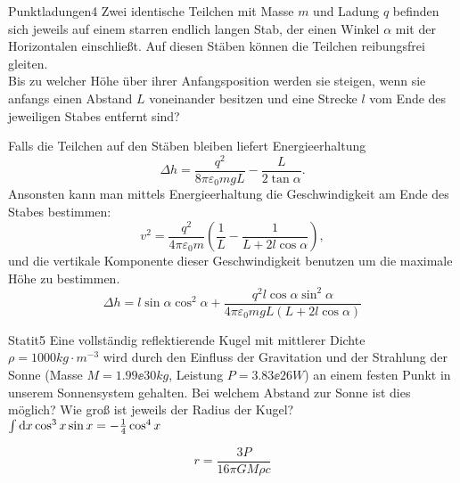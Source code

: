


\begin{problem}{Punktladungen}{4}
Zwei identische Teilchen mit Masse $m$ und Ladung $q$ befinden sich jeweils auf einem starren endlich langen Stab, der einen Winkel $\alpha$ mit der Horizontalen einschließt. Auf diesen Stäben können die Teilchen reibungsfrei gleiten.\\
Bis zu welcher Höhe über ihrer Anfangsposition werden sie steigen, wenn sie anfangs einen Abstand $L$ voneinander besitzen und eine Strecke $l$ vom Ende des jeweiligen Stabes entfernt sind?
\begin{solution}
Falls die Teilchen auf den Stäben bleiben liefert Energieerhaltung
\[
\Delta h=\frac{q^2}{8 \pi \varepsilon_0 m g L}-\frac{L}{2 \tan\alpha}.
\]
Ansonsten kann man mittels Energieerhaltung die Geschwindigkeit am Ende des Stabes bestimmen:
\[
v^2 = \frac{q^2}{4 \pi \varepsilon_0 m} \left( \frac1{L} - \frac1{L+2 l \cos\alpha} \right),
\]
und die vertikale Komponente dieser Geschwindigkeit benutzen um die maximale Höhe zu bestimmen.
\[
\Delta h=l \sin\alpha \cos^2 \alpha+ \frac{q^2 l \cos\alpha \sin^2 \alpha}{4 \pi \varepsilon_0 m g L (L+2 l \cos\alpha)}
\]
\end{solution}
\end{problem}

\begin{problem}{Statit}{5}
Eine vollständig reflektierende Kugel mit mittlerer Dichte $\rho=1000 \unit{kg\cdot m^{-3}}$ wird durch den Einfluss der Gravitation und der Strahlung der Sonne (Masse $M=1.99 \ee{30} \unit{kg}$, Leistung $P=3.83 \ee{26} \unit{W}$) an einem festen Punkt in unserem Sonnensystem gehalten. Bei welchem Abstand zur Sonne ist dies möglich? Wie groß ist jeweils der Radius der Kugel?\\
\hinweis $\int \mathrm{d} x \cos^3 x \sin x=-\frac 14 \cos^4 x$ 

\begin{solution}
\[
r=\frac{3 P}{16 \pi G M \rho c}
\]
\end{solution}
\end{problem}

